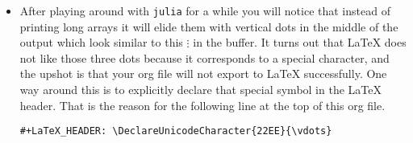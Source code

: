 \documentclass[11pt]{article}
\begin{document}
\begin{itemize}
\item After playing around with \texttt{julia} for a while you will notice that
instead of printing long arrays it will elide them with vertical
dots in the middle of the output which look similar to this \(
  \vdots \) in the buffer.  It turns out that \LaTeX{} does not like
those three dots because it corresponds to a special character, and
the upshot is that your org file will not export to \LaTeX{}
successfully.  One way around this is to explicitly declare that
special symbol in the \LaTeX{} header.  That is the reason for the
following line at the top of this org file.

\begin{verbatim}
#+LaTeX_HEADER: \DeclareUnicodeCharacter{22EE}{\vdots}
\end{verbatim}
\end{itemize}
\end{document}
